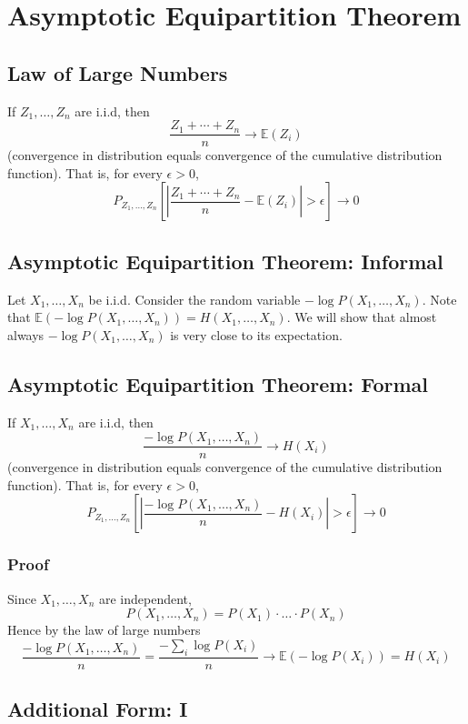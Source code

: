 \documentclass{article}
\begin{document}
\section{Asymptotic Equipartition Theorem}

\subsection{Law of Large Numbers}

If $Z_1,\ldots,Z_n$ are i.i.d, then 
\[
\frac{Z_1 + \cdots + Z_n}{n}\to \mathbb{E}(Z_i)
\]
(convergence in distribution equals convergence of the cumulative distribution function). That is, for every $\epsilon > 0$,
\[
P_{Z_1,\ldots,Z_n}\left[ | \frac{Z_1 + \cdots + Z_n}{n} - \mathbb{E}(Z_i) |>\epsilon \right] \to 0
\]

\subsection{Asymptotic Equipartition Theorem: Informal}

Let $X_1,\ldots,X_n$ be i.i.d. Consider the random variable $-\log P\left(X_1,\ldots, X_n\right)$. Note that $\mathbb{E}\left(-\log P\left(X_1,\ldots, X_n\right) \right)=H(X_1,\ldots,X_n)$. We will show that almost always $-\log P\left(X_1,\ldots, X_n\right)$ is very close to its expectation.

\subsection{Asymptotic Equipartition Theorem: Formal}

If $X_1,\ldots, X_n$ are i.i.d, then 
\[
\frac{-\log P(X_1,\ldots, X_n)}{n}\to H(X_i)
\]
(convergence in distribution equals convergence of the cumulative distribution function). That is, for every $\epsilon > 0$,
\[
P_{Z_1,\ldots,Z_n}\left[ | \frac{-\log P(X_1,\ldots, X_n)}{n} - H(X_i) |>\epsilon \right] \to 0
\]

\subsubsection{Proof}

Since $X_1,\ldots,X_n$ are independent,
\[
P(X_1,\ldots,X_n)=P(X_1)\cdot\ldots\cdot P(X_n)
\]
Hence by the law of large numbers 
\[
\frac{-\log P(X_1,\ldots, X_n)}{n}  = \frac{-\sum_i \log P(X_i)}{n}\to \mathbb{E}\left(-\log P(X_i)\right)=H(X_i)
\]

\subsection{Additional Form: I}
\end{document}
